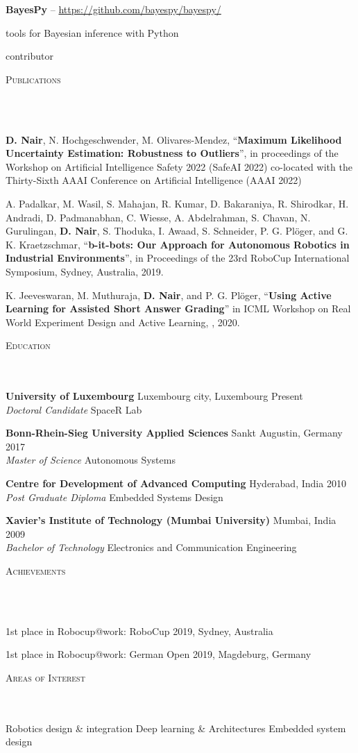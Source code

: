 \documentclass{article}
\newcommand{\header}[1]{{
\hspace*{-15pt}\vspace*{6pt} \textsc{#1}} \vspace*{-6pt} 
\lineunder
}
\newcommand{\lineunder}{
\vspace*{-8pt} \\ \hspace*{-18pt} 
\hrulefill \\
}
\newcommand{\content}{
\vspace*{2pt}%
}
\newcommand{\school}[4]{
\textbf{#1} \labelitemi #2 \hfill #3 \\ #4 \vspace*{5pt}
}
\newcommand{\employer}[4]{{
\vspace*{2pt}%
\textbf{#1} #2 \hfill #3\\ #4 \vspace*{2pt}}
}
\renewcommand{\labelitemi}{
	\raisebox{0.3ex}{\tiny\textbullet}
}
\renewcommand{\labelitemii}{
	\raisebox{0.3ex}{\tiny\textbullet}
}
\newenvironment{bullet-list-major}{
\begin{list}{\labelitemii}{\setlength\leftmargin{3pt} 
\topsep 0pt \itemsep -2pt}}{\vspace*{4pt}\end{list}
}
\newenvironment{bullet-list-minor}{
\begin{list}{\labelitemii}{\setlength\leftmargin{15pt} 
\topsep 0pt \itemsep -2pt}}{\vspace*{4pt}\end{list}
}
\begin{document}
\employer{BayesPy}{-- \url{https://github.com/bayespy/bayespy/}}{}{}    
    \begin{bullet-list-minor}
    \item tools for Bayesian inference with Python
    \item contributor
    \end{bullet-list-minor}
    
  
\vspace*{4pt}%
\header{Publications}
\begin{bullet-list-major}
 \item \textbf{D. Nair}, N. Hochgeschwender, M. Olivares-Mendez,  ``\textbf{Maximum Likelihood Uncertainty Estimation: Robustness to Outliers}'', in proceedings of the Workshop on Artificial Intelligence Safety 2022 (SafeAI 2022)
co-located with the Thirty-Sixth AAAI Conference on Artificial Intelligence (AAAI 2022) 
 \item A. Padalkar, M. Wasil, S. Mahajan, R. Kumar, D. Bakaraniya, R. Shirodkar, H. Andradi, D. Padmanabhan, C. Wiesse, A. Abdelrahman, S. Chavan, N. Gurulingan, \textbf{D. Nair}, S. Thoduka, I. Awaad, S. Schneider, P. G. Pl\"{o}ger, and G. K. Kraetzschmar, ``\textbf{b-it-bots: Our Approach for Autonomous Robotics in Industrial Environments}'', in Proceedings of the 23rd RoboCup International Symposium, Sydney, Australia, 2019. 
 \item K. Jeeveswaran, M. Muthuraja, \textbf{D. Nair}, and P. G. Pl\"{o}ger, ``\textbf{Using Active Learning for Assisted Short Answer Grading}'' in ICML Workshop on Real World Experiment Design and Active Learning, , 2020. 
\end{bullet-list-major}

\vspace*{4pt}%
\header{Education}
    \school{University of Luxembourg}{Luxembourg city, Luxembourg}{Present}
    {\textit{Doctoral Candidate} \labelitemi SpaceR Lab}
    
    \school{Bonn-Rhein-Sieg University Applied Sciences}{Sankt Augustin, Germany}{ 2017}
    {\textit{Master of Science } \labelitemi Autonomous Systems}
    
    \school{Centre for Development of Advanced Computing}{Hyderabad, India}{2010}
    {\textit{Post Graduate Diploma} \labelitemi Embedded Systems Design }

    \school{Xavier's Institute of Technology (Mumbai University)}{Mumbai, India}{2009}
    {\textit{Bachelor of Technology} \labelitemi Electronics and Communication Engineering }

\vspace*{4pt}%
\header{Achievements}
    \begin{bullet-list-major}
    \item 1st place in Robocup@work: RoboCup 2019, Sydney, Australia
    \item 1st place in Robocup@work: German Open 2019, Magdeburg, Germany
    \end{bullet-list-major}

\vspace*{4pt}%
\header{Areas of Interest}
    \content{\labelitemi Robotics design \& integration \labelitemi Deep learning \& Architectures \labelitemi Embedded system design  \vspace{5pt}}
\end{document}
